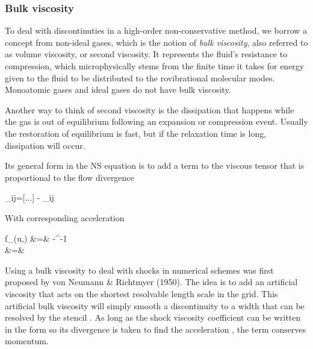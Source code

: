 \subsubsection{Bulk viscosity}

To deal with discontinuties in a high-order non-conservative method,
we borrow a concept from non-ideal gases, which is the notion
of {\it bulk viscosity}, also referred to as volume viscosity, or second
viscosity. It represents the fluid's resistance to
compression, which microphysically stems from the finite
time it takes for energy given to the fluid to be distributed to the
rovibrational molecular modes. Monoatomic gases and ideal gases do not have bulk
viscosity.

Another way to think of second viscosity is the dissipation that
happens while the gas is out of equilibrium following an expansion or
compression event. Usually the restoration of equilibrium is fast, but
if the relaxation time is long, dissipation will occur. 

Its general form in the NS equation is to add a term to the viscous
tensor that is proportional to the flow divergence

\beq
\pi_{ij}=[...] - \rho\zeta \delta_{ij} 
\label{eq:pizeta}
\eeq

With corresponding acceleration 

 \beqn
 f_\nu(u,\rho) &=& -\rho^{-1}\Div{\v{\pi}} \\
 &=&\zeta{}
\label{eq:zeta-acceleration}
 \eeqn

  


Using a bulk viscosity to deal with shocks in numerical schemes was
first proposed by von Neumann \& Richtmyer (1950). The idea is to add
an artificial viscosity that acts on the shortest resolvable length
scale in the grid. This artificial bulk viscosity will simply smooth a
 discontinuity to a width that can be resolved by the stencil . As long
 as the shock viscosity coefficient can be written in the form
  so its divergence is taken to find the acceleration
 , the term conserves momentum. 


